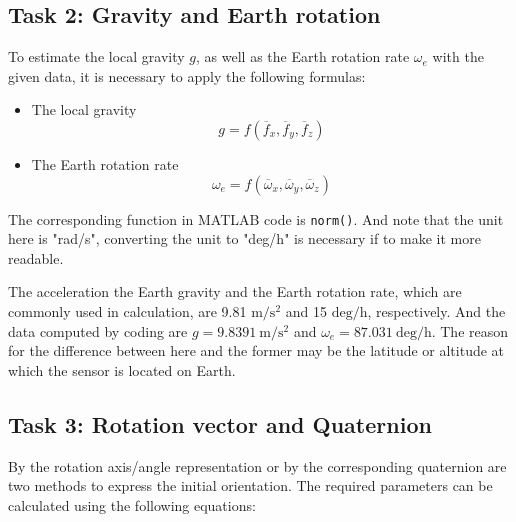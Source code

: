 \documentclass[class=article, crop=false]{standalone}
\begin{document}
\subsection{Task 2: Gravity and Earth rotation}
To estimate the local gravity $g$, as well as the Earth rotation rate $\omega_e$ with the given data, it is necessary to apply the following formulas:

\begin{itemize}
    \item The local gravity
    \begin{equation}
        g = f(\overline{f}_x, \overline{f}_y, \overline{f}_z)
    \end{equation}
    \item The Earth rotation rate
    \begin{equation}
        \omega_e = f(\overline{\omega}_x, \overline{\omega}_y, \overline{\omega}_z)
    \end{equation}
\end{itemize}

The corresponding function in MATLAB code is \verb|norm()|. And note that the unit here is "rad/s", converting the unit to "deg/h" is necessary if to make it more readable.

The acceleration the Earth gravity and the Earth rotation rate, which are commonly used in calculation, are 9.81 $\mathrm{m/s^2}$ and 15 $\mathrm{deg/h}$, respectively. And the data computed by coding are $g = 9.8391 \ \mathrm{m/s^2}$ and $\omega_e = 87.031 \ \mathrm{deg/h}$. The reason for the difference between here and the former may be the latitude or altitude at which the sensor is located on Earth.

\subsection{Task 3: Rotation vector and Quaternion}
By the rotation axis/angle representation or by the corresponding quaternion are two methods to express the initial orientation. The required parameters can be calculated using the following equations:
\end{document}
